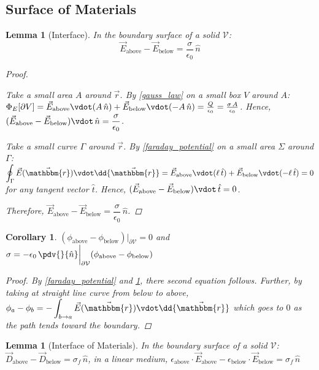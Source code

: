 \documentclass[12pt]{article}
\newcommand*{\rv}{\vec{r}}
\newcommand*{\irv}{\vec{\mathbbm{r}}}
\newcommand*{\vE}{\vec{E}}
\newcommand*{\ee}{\epsilon_0}
\newcommand*{\vol}{\mathcal{V}}
\newtheorem{lemma}[theorem]{Lemma}
\newtheorem{corollary}[theorem]{Corollary}
\begin{document}
\pagebreak

\subsection{Surface of Materials}

\begin{lemma}[Interface]
  \label{surface_E_field}
  In the boundary surface of a solid $\vol$: $$\vE_\text{above}-\vE_\text{below}=\frac{\sigma}{\ee}\,\hat{n}$$
  \begin{proof}
    \begin{compactenum}
      \item Take a small area $A$ around $\rv$. By \ref{gauss_law} on a small box $V$ around $A$: $\Phi_E[\partial V]=\vE_\text{above}\vdot(A\,\hat{n})+\vE_\text{below}\vdot(-A\,\hat{n})=\frac{Q}{\ee}=\frac{\sigma\,A}{\ee}$. Hence, $(\vE_\text{above}-\vE_\text{below})\vdot\,\hat{n}=\dfrac{\sigma}{\ee}$.
      \item Take a small curve $\Gamma$ around $\rv$. By \ref{faraday_potential} on a small area $\Sigma$ around $\Gamma$: $\displaystyle\oint_\Gamma\vE(\irv)\vdot\dd{\irv}=\vE_\text{above}\vdot(\ell\,\hat{t})+\vE_\text{below}\vdot(-\ell\,\hat{t})=0$ for any tangent vector $\hat{t}$. Hence, $(\vE_\text{above}-\vE_\text{below})\vdot\,\hat{t}=0$.
    \end{compactenum}
    Therefore, $\vE_\text{above}-\vE_\text{below}=\dfrac{\sigma}{\ee}\,\hat{n}$.
  \end{proof}
\end{lemma}

\begin{corollary}
  $(\phi_\text{above}-\phi_\text{below})\big|_{\partial\vol}=0$ and $\displaystyle\sigma=-\ee\,\pdv{}{\hat{n}}\bigg|_{\partial\vol}(\phi_\text{above}-\phi_\text{below})$
  \begin{proof}
    By \ref{faraday_potential} and \ref{surface_E_field}, there second equation follows. Further, by taking at straight line curve from below to above, $\displaystyle \phi_a-\phi_b=-\int_{b\to a}\vE(\irv)\vdot\dd{\irv}$ which goes to $0$ as the path tends toward the boundary.
  \end{proof}
\end{corollary}

\begin{lemma}[Interface of Materials]
  In the boundary surface of a solid $\vol$: $\vec{D}_\text{above}-\vec{D}_\text{below}=\sigma_f\,\hat{n}$, in a linear medium, $\epsilon_\text{above}\cdot \vE_\text{above}-\epsilon_\text{below}\cdot\vE_\text{below}=\sigma_f\,\hat{n}$
\end{lemma}
\end{document}
